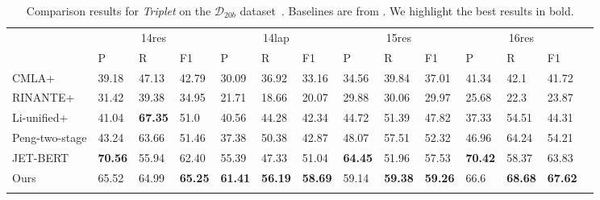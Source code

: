 \documentclass[11pt,a4paper]{article}
\begin{document}
\begin{table*}[!ht]
    \centering\small
    \setlength{\tabcolsep}{0.75pt} \renewcommand{\arraystretch}{1.3}
    \begin{tabular}{m{2.5cm}m{1.065cm}<{\centering}m{1.065cm}<{\centering}m{1.065cm}<{\centering}|m{1.065cm}<{\centering}m{1.065cm}<{\centering}m{1.065cm}<{\centering}|m{1.065cm}<{\centering}m{1.065cm}<{\centering}m{1.065cm}<{\centering}|m{1.065cm}<{\centering}m{1.065cm}<{\centering}m{1.065cm}<{\centering}m{1.065cm}<{\centering}}
      \Xhline{0.08em}
      \multirow{2}{*}{Model} & \multicolumn{3}{c|}{14res} & \multicolumn{3}{c|}{14lap} & \multicolumn{3}{c|}{15res} & \multicolumn{3}{c}{16res}                                                                                            \\
      \cline{2-13}
                             & P                          & R                          & F1                         & P                         & R     & F1             & P     & R     & F1             & P     & R     & F1             \\
      \cline{1-13}
      CMLA+                  & 39.18                      & 47.13                      & 42.79                      & 30.09                     & 36.92 & 33.16          & 34.56 & 39.84 & 37.01          & 41.34 & 42.1  & 41.72          \\
      RINANTE+               & 31.42                      & 39.38                      & 34.95                      & 21.71                     & 18.66 & 20.07          & 29.88 & 30.06 & 29.97          & 25.68 & 22.3  & 23.87          \\
      Li-unified+            & 41.04                      & \textbf{67.35}                      & 51.0                       & 40.56                     & 44.28 & 42.34          & 44.72 & 51.39 & 47.82          & 37.33 & 54.51 & 44.31          \\
      Peng-two-stage         & 43.24                      & 63.66                      & 51.46                      & 37.38                     & 50.38 & 42.87          & 48.07 & 57.51 & 52.32          & 46.96 & 64.24 & 54.21          \\
      JET-BERT               & \textbf{70.56}                      & 55.94                      & 62.40                       & 55.39                     & 47.33 & 51.04          & \textbf{64.45} & 51.96 & 57.53          & \textbf{70.42} & 58.37 & 63.83          \\
      \Xhline{0.05em}
      Ours                   & 65.52                     & 64.99                      & \textbf{65.25}             & \textbf{61.41}                     & \textbf{56.19} & \textbf{58.69} & 59.14 & \textbf{59.38} & \textbf{59.26} & 66.6 & \textbf{68.68}& \textbf{67.62} \\
      \Xhline{0.08em}
    \end{tabular}
    \caption{Comparison results for \emph{Triplet} on the  $\mathcal{D}_{20b}$ dataset~\citep{DBLP:conf/emnlp/XuLLB20}. Baselines are from \citep{DBLP:conf/emnlp/XuLLB20}. We highlight the best results in bold.}
    \label{tb:pengb}
  \end{table*}
\end{document}

